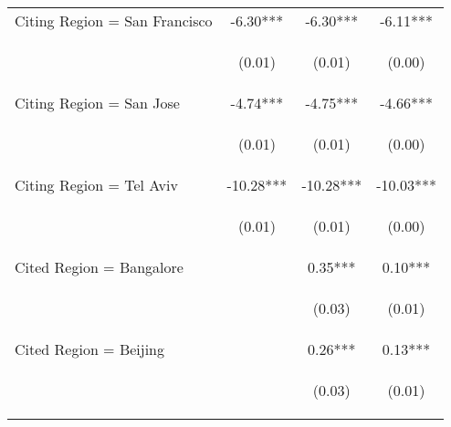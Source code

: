 \begin{center}
\begin{tabular}{lccc}
Citing Region = San Francisco & -6.30*** & -6.30*** & -6.11*** \\
\vspace{4pt} & \begin{footnotesize}(0.01)\end{footnotesize} & \begin{footnotesize}(0.01)\end{footnotesize} & \begin{footnotesize}(0.00)\end{footnotesize} \\
Citing Region = San Jose & -4.74*** & -4.75*** & -4.66*** \\
\vspace{4pt} & \begin{footnotesize}(0.01)\end{footnotesize} & \begin{footnotesize}(0.01)\end{footnotesize} & \begin{footnotesize}(0.00)\end{footnotesize} \\
Citing Region = Tel Aviv & -10.28*** & -10.28*** & -10.03*** \\
\vspace{4pt} & \begin{footnotesize}(0.01)\end{footnotesize} & \begin{footnotesize}(0.01)\end{footnotesize} & \begin{footnotesize}(0.00)\end{footnotesize} \\
Cited Region = Bangalore &  & 0.35*** & 0.10*** \\
\vspace{4pt} & \begin{footnotesize}\end{footnotesize} & \begin{footnotesize}(0.03)\end{footnotesize} & \begin{footnotesize}(0.01)\end{footnotesize} \\
Cited Region = Beijing &  & 0.26*** & 0.13*** \\
\vspace{4pt} & \begin{footnotesize}\end{footnotesize} & \begin{footnotesize}(0.03)\end{footnotesize} & \begin{footnotesize}(0.01)\end{footnotesize} \\

\end{tabular}
\end{center}
